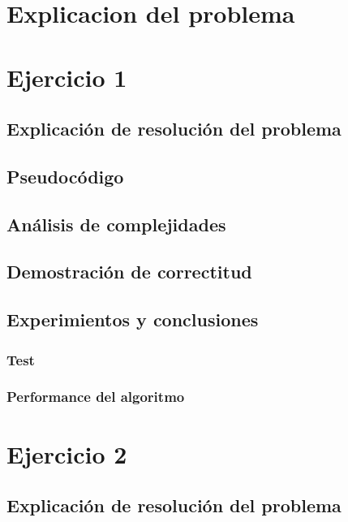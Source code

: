 \documentclass[12pt, a4paper]{article}
\begin{document}
\maketitle
\tableofcontents
\newpage

\newpage
\section{Explicacion del problema}

\newpage
\section{Ejercicio 1} 
\subsection{Explicaci\'on de resoluci\'on del problema}

\subsection{Pseudoc\'odigo}

\subsection{An\'alisis de complejidades}

\subsection{Demostraci\'on de correctitud}

\subsection{Experimientos y conclusiones}
\subsubsection[1.5]{Test}
%
\subsubsection[1.5]{Performance del algoritmo}
%

\newpage
\section{Ejercicio 2} 
\subsection{Explicaci\'on de resoluci\'on del problema}

\end{document}
